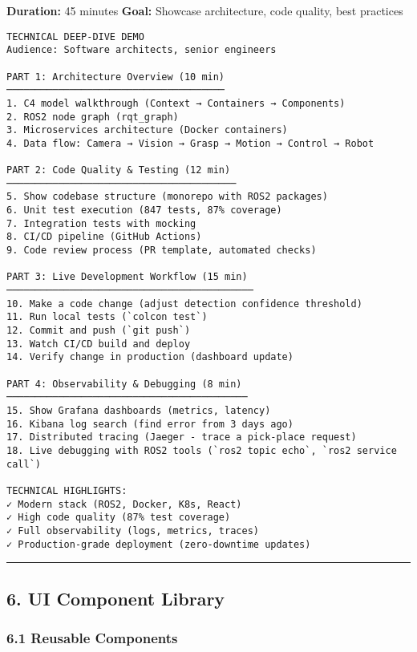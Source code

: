 \documentclass[
]{article}
\begin{document}
\textbf{Duration:} 45 minutes \textbf{Goal:} Showcase architecture, code
quality, best practices

\begin{verbatim}
TECHNICAL DEEP-DIVE DEMO
Audience: Software architects, senior engineers

PART 1: Architecture Overview (10 min)
──────────────────────────────────────
1. C4 model walkthrough (Context → Containers → Components)
2. ROS2 node graph (rqt_graph)
3. Microservices architecture (Docker containers)
4. Data flow: Camera → Vision → Grasp → Motion → Control → Robot

PART 2: Code Quality & Testing (12 min)
────────────────────────────────────────
5. Show codebase structure (monorepo with ROS2 packages)
6. Unit test execution (847 tests, 87% coverage)
7. Integration tests with mocking
8. CI/CD pipeline (GitHub Actions)
9. Code review process (PR template, automated checks)

PART 3: Live Development Workflow (15 min)
───────────────────────────────────────────
10. Make a code change (adjust detection confidence threshold)
11. Run local tests (`colcon test`)
12. Commit and push (`git push`)
13. Watch CI/CD build and deploy
14. Verify change in production (dashboard update)

PART 4: Observability & Debugging (8 min)
──────────────────────────────────────────
15. Show Grafana dashboards (metrics, latency)
16. Kibana log search (find error from 3 days ago)
17. Distributed tracing (Jaeger - trace a pick-place request)
18. Live debugging with ROS2 tools (`ros2 topic echo`, `ros2 service call`)

TECHNICAL HIGHLIGHTS:
✓ Modern stack (ROS2, Docker, K8s, React)
✓ High code quality (87% test coverage)
✓ Full observability (logs, metrics, traces)
✓ Production-grade deployment (zero-downtime updates)
\end{verbatim}

\begin{center}\rule{0.5\linewidth}{0.5pt}\end{center}

\hypertarget{ui-component-library}{%
\subsection{6. UI Component Library}\label{ui-component-library}}

\hypertarget{reusable-components}{%
\subsubsection{6.1 Reusable Components}\label{reusable-components}}
\end{document}
